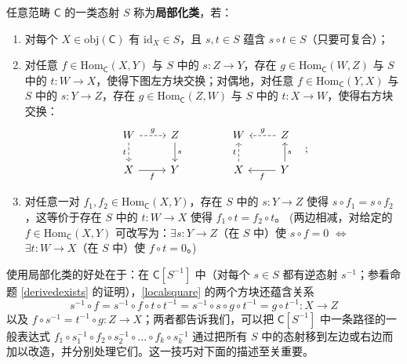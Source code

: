 \begin{Def}\label{locclass}
	任意范畴 $\mathsf{C}$ 的一类态射 $S$ 称为\textbf{局部化类}，若：
	\renewcommand{\theenumi}{\alph{enumi}}
	\begin{enumerate}[leftmargin=0.6cm] 
		\item 对每个 $X\in\text{obj}(\mathsf{C})$ 有 $\text{id}_X\in S$，且 $s, t\in S$ 蕴含 $s\circ t\in S$（只要可复合）；
		
		\item 对任意 $f\in\text{Hom}_\mathsf{C}(X,Y)$ 与 $S$ 中的 $s:Z\rightarrow Y$，存在 $g\in\text{Hom}_\mathsf{C}(W,Z)$ 与 $S$ 中的 $t:W\rightarrow X$，使得下图左方块交换；对偶地，对任意 $f\in\text{Hom}_\mathsf{C}(Y,X)$ 与 $S$ 中的 $s:Y\rightarrow Z$，存在 $g\in\text{Hom}_\mathsf{C}(Z,W)$ 与 $S$ 中的 $t:X\rightarrow W$，使得右方块交换：
		\begin{equation}\label{localsquare}
			\begin{tikzcd}
				W\arrow[r, dashed, "g"]\arrow[d, dashed, "t"'] & Z\arrow[d, "s"] \\
				X\arrow[r, "f"'] & Y
			\end{tikzcd}
			\qquad\qquad
			\begin{tikzcd}
				W & Z\arrow[l, dashed, "g"'] \\
				X\arrow[u, dashed, "t"] & Y\arrow[l, "f"]\arrow[u, "s"']
			\end{tikzcd}\quad;
		\end{equation}
		
		\item 对任意一对 $f_1,f_2\in\text{Hom}_\mathsf{C}(X,Y)$，存在 $S$ 中的 $s:Y\rightarrow Z$ 使得 $s\circ f_1= s\circ f_2$，这等价于存在 $S$ 中的 $t:W\rightarrow X$ 使得 $f_1\circ t= f_2\circ t$。
		\newline \big(两边相减，对给定的 $f\in\text{Hom}_\mathsf{C}(X,Y)$ 可改写为：$\exists s:Y\rightarrow Z$（在 $S$ 中）使 $s\circ f=0$ $\Longleftrightarrow$ $\exists t:W\rightarrow X$（在 $S$ 中）使 $f\circ t= 0$。\big)
	\end{enumerate}
\end{Def}


使用局部化类的好处在于：在 $\mathsf{C}[S^{-1}]$ 中（对每个 $s\in S$ 都有逆态射 $s^{-1}$；参看命题 \ref{derivedexists} 的证明），\eqref{localsquare} 的两个方块还蕴含关系
\[
s^{-1}\circ f= s^{-1}\circ f\circ t\circ t^{-1}= s^{-1}\circ s\circ g\circ t^{-1} = g\circ t^{-1}:X\rightarrow Z
\]
以及 $f\circ s^{-1}= t^{-1}\circ g:Z\rightarrow X$；两者都告诉我们，可以把 $\mathsf{C}[S^{-1}]$ 中一条路径的一般表达式 $f_1\circ s_1^{-1}\circ f_2\circ s_2^{-1}\circ...\circ f_k\circ s_k^{-1}$ 通过把所有 $S$ 中的态射移到左边或右边而加以改造，并分别处理它们。这一技巧对下面的描述至关重要。

